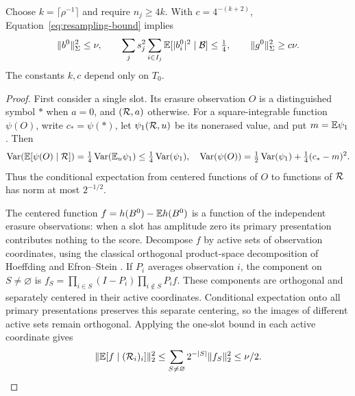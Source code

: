 \begin{lemma}\label{lem:amplitude-signal}
Choose $k=\lceil\rho^{-1}\rceil$ and require $n_j\ge4k$. With
$c=4^{-(k+2)}$, Equation~\ref{eq:resampling-bound} implies
\begin{equation}\label{eq:amplitude-signal}
 \|b^0\|_\Sigma^2\le\nu,\qquad
 \sum_j s_j^2\sum_{i\in I_j}\mathbb E[|b_i^0|^2\mid\mathcal B]\le\tfrac14,
 \qquad \|g^0\|_\Sigma^2\ge c\nu.
\end{equation}
The constants $k,c$ depend only on $T_0$.
\end{lemma}

\begin{proof}
First consider a single slot. Its erasure observation $O$ is a distinguished
symbol $*$ when $a=0$, and $(\mathcal R,a)$ otherwise. For a square-integrable
function $\psi(O)$, write $c_*=\psi(*)$, let $\psi_1(\mathcal R,u)$ be its
nonerased value, and put $m=\mathbb E\psi_1$. Then
\[
 \operatorname{Var}(\mathbb E[\psi(O)\mid\mathcal R])
 =\tfrac14\operatorname{Var}(\mathbb E_u\psi_1)\le\tfrac14\operatorname{Var}(\psi_1),
 \quad
 \operatorname{Var}(\psi(O))=\tfrac12\operatorname{Var}(\psi_1)+\tfrac14(c_*-m)^2.
\]
Thus the conditional expectation from centered functions of $O$ to
functions of $\mathcal R$ has norm at most $2^{-1/2}$.

The centered function $f=h(B^0)-\mathbb E h(B^0)$ is a function of the independent
erasure observations: when a slot has amplitude zero its primary
presentation contributes nothing to the score. Decompose $f$ by active
sets of observation coordinates, using the classical orthogonal
product-space decomposition of Hoeffding and Efron--Stein
\cite{Hoeffding1948,EfronStein1981}. If $P_i$ averages observation $i$, the
component on $S\ne\varnothing$ is
$f_S=\prod_{i\in S}(I-P_i)\prod_{i\notin S}P_if$.
These components are orthogonal and separately centered in their active
coordinates. Conditional expectation onto all primary presentations
preserves this separate centering, so the images of different active
sets remain orthogonal. Applying the one-slot bound in each active
coordinate gives
\begin{equation}\label{eq:erasure-contraction}
 \|\mathbb E[f\mid(\mathcal R_i)_i]\|_2^2
 \le\sum_{S\ne\varnothing}2^{-|S|}\|f_S\|_2^2\le\nu/2.
\end{equation}


\end{proof}
